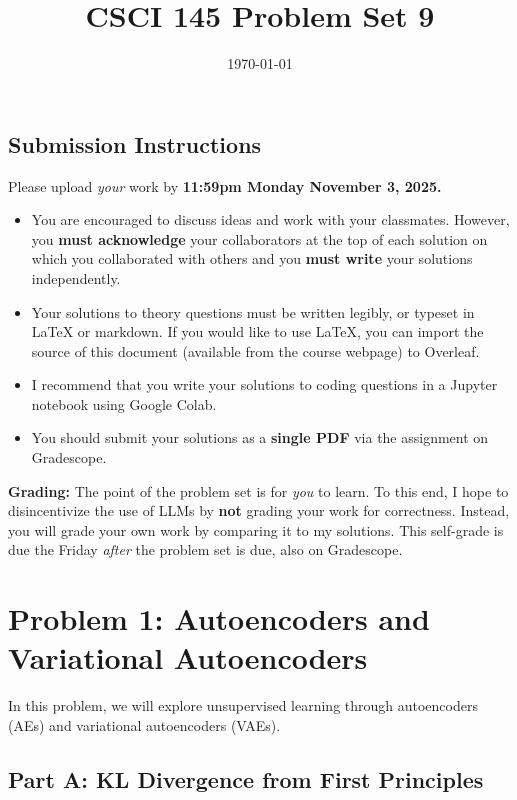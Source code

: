 \documentclass{article}
\title{CSCI 145 Problem Set 9}
\author{} %
\date{\today}
\begin{document}
\maketitle

\subsection*{Submission Instructions}

Please upload \textit{your} work by
\textbf{11:59pm Monday November 3, 2025.}
\begin{itemize}
\item You are encouraged to discuss ideas
and work with your classmates. However, you
\textbf{must acknowledge} your collaborators
at the top of each solution on which
you collaborated with others 
and you \textbf{must write} your solutions
independently.
\item Your solutions to theory questions must
be written legibly, or typeset in LaTeX or markdown.
If you would like to use LaTeX, you can import the source of this document (available from the course webpage) to Overleaf.
\item I recommend that you write your solutions to coding questions in a Jupyter notebook using Google Colab.
\item You should submit your solutions as a \textbf{single PDF} via the assignment on Gradescope.
\end{itemize}

\noindent
\textbf{Grading:} The point of the problem set is for \textit{you} to learn. To this end, I hope to disincentivize the use of LLMs by \textbf{not} grading your work for correctness. Instead, you will grade your own work by comparing it to my solutions. This self-grade is due the Friday \textit{after} the problem set is due, also on Gradescope.

\newpage
\section*{Problem 1: Autoencoders and Variational Autoencoders}

In this problem, we will explore unsupervised learning through autoencoders (AEs) and variational autoencoders (VAEs).

\subsection*{Part A: KL Divergence from First Principles}
\end{document}
